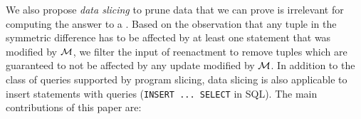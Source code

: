 We also propose \emph{data slicing} to prune data that we can prove is irrelevant for computing the answer to a \abbrHW. Based on the observation that any tuple in the symmetric difference has to be affected by at least one statement that was modified by $\mathcal{M}$, we filter the input of reenactment to remove tuples which are guaranteed to not be affected by any update modified by $\mathcal{M}$. In addition to the class of queries supported by program slicing, data slicing is also applicable to insert statements with queries (\lstinline!INSERT ... SELECT! in SQL).
The main contributions of this paper are:
